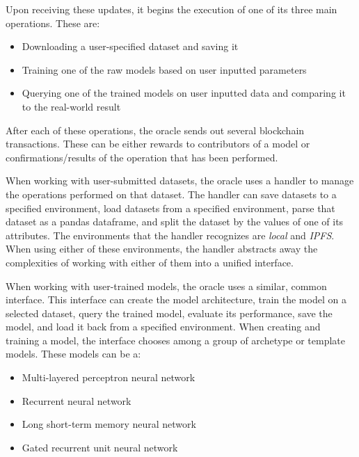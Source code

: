 \documentclass{ledger}
\begin{document}
Upon receiving these updates, it begins the execution of one of its three main operations.  These are:

\begin{itemize}
    \item Downloading a user-specified dataset and saving it
    \item Training one of the raw models based on user inputted parameters
    \item Querying one of the trained models on user inputted data and comparing it to the real-world result
\end{itemize}

After each of these operations, the oracle sends out several blockchain transactions.  These can be either
rewards to contributors of a model or confirmations/results of the operation that has been performed.

When working with user-submitted datasets, the oracle uses a handler to manage the operations performed on that dataset.
The handler can save datasets to a specified environment, load datasets from a specified environment, parse that dataset
as a pandas dataframe, and split the dataset by the values of one of its attributes.  The environments that the handler
recognizes are \textit{local} and \textit{IPFS}.  When using either of these environments, the handler abstracts away the
complexities of working with either of them into a unified interface.

When working with user-trained models, the oracle uses a similar, common interface.  This interface can create the model
architecture, train the model on a selected dataset, query the trained model, evaluate its performance, save the model,
and load it back from a specified environment.  When creating and training a model, the interface chooses among a group
of archetype or template models.  These models can be a:

\begin{itemize}
    \item Multi-layered perceptron neural network~\cite{preceptrons}
    \item Recurrent neural network~\cite{RNN}
    \item Long short-term memory neural network~\cite{LSTM}
    \item Gated recurrent unit neural network~\cite{GRU}
\end{itemize}
\end{document}
